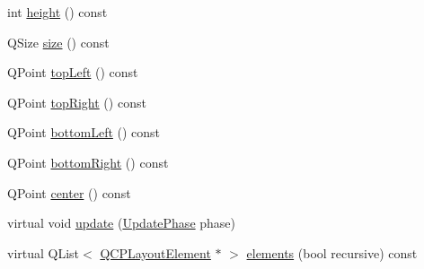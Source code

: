 \begin{DoxyCompactItemize}
int \hyperlink{class_q_c_p_axis_rect_acc4377809e79d9a089ab790f39429b0d}{height} () const
\item 
Q\+Size \hyperlink{class_q_c_p_axis_rect_a7a8289346eb612f422c704f8b75cf479}{size} () const
\item 
Q\+Point \hyperlink{class_q_c_p_axis_rect_a5a847b3ddeca3abec38d3838fefb0dbd}{top\+Left} () const
\item 
Q\+Point \hyperlink{class_q_c_p_axis_rect_a7aa221967549ba71b98c465bf8234758}{top\+Right} () const
\item 
Q\+Point \hyperlink{class_q_c_p_axis_rect_ab15d4311d6535ccd7af504dc0e2b98c6}{bottom\+Left} () const
\item 
Q\+Point \hyperlink{class_q_c_p_axis_rect_a36dac884ec8fa3a3a2f3842ca7b7d32d}{bottom\+Right} () const
\item 
Q\+Point \hyperlink{class_q_c_p_axis_rect_ade3aef874bafcec6dd16174fba44c0b1}{center} () const
\item 
virtual void \hyperlink{class_q_c_p_axis_rect_a255080a017df9083a60a321ef2ba9ed8}{update} (\hyperlink{class_q_c_p_layout_element_a0d83360e05735735aaf6d7983c56374d}{Update\+Phase} phase)
\item 
virtual Q\+List$<$ \hyperlink{class_q_c_p_layout_element}{Q\+C\+P\+Layout\+Element} $\ast$ $>$ \hyperlink{class_q_c_p_axis_rect_a40c0b3b17eb317ff4d393b7cb9b082a2}{elements} (bool recursive) const
\end{DoxyCompactItemize}
